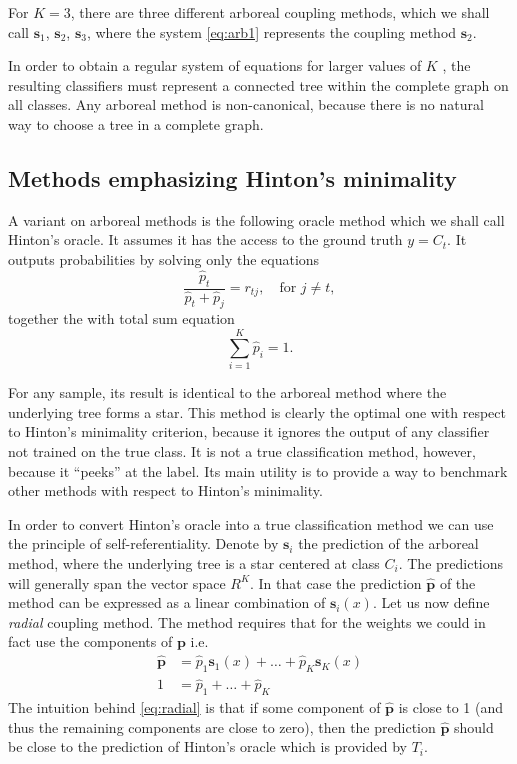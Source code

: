 \documentclass[twoside,11pt]{article}
\begin{document}
For $K=3$, there are three different arboreal coupling methods, which we shall call $\boldsymbol{s}_1$, $\boldsymbol{s}_2$, $\boldsymbol{s}_3$, where the system \eqref{eq:arb1} represents the coupling method $\boldsymbol{s}_2$.

In order to obtain a regular system of equations for  larger values of $K$ , the resulting classifiers must represent a connected tree within the complete graph on all classes. Any arboreal method is non-canonical, because there is no natural way to choose a tree in a complete graph.

\subsection{Methods emphasizing Hinton's minimality}

A variant on arboreal methods is the following oracle method which we shall call Hinton's oracle. It  assumes it has the access to the ground truth $y = C_t$. It outputs probabilities by solving only the equations
$$
\frac{\hat p_t}{\hat p_t + \hat p_j} = {r}_{tj},\quad \textrm{for }j\not = t,
$$
together the  with total sum equation
$$
\sum_{i=1}^K  \hat p_i = 1.
$$

For any sample, its result is identical to the arboreal method where the underlying tree forms a star. This method is clearly the optimal one with respect to Hinton's minimality criterion, because it ignores the output of any classifier not trained on the true class. It is not a true classification method, however, because it ``peeks'' at the label. Its main utility is to provide a way to benchmark other methods with respect to Hinton's minimality.

In order to convert Hinton's oracle into a true classification method we can use the principle of self-referentiality.  Denote by $\boldsymbol{s}_i$ the prediction of the arboreal method, where the underlying tree is a star centered at class $C_i$. The predictions will generally span the vector space $R^K$. In that case the prediction $\hat{\boldsymbol{p}}$ of the method  can be expressed as a linear combination of $\boldsymbol{s}_i(x)$. Let us now define \emph{radial} coupling method. The  method requires that for the  weights we could in fact use the components of $\boldsymbol{p}$ i.e.
\begin{equation}
	\begin{split}
	\hat {\boldsymbol{p}} &= \hat p_1 \boldsymbol{s}_1(x) + \ldots + \hat p_K \boldsymbol{s}_K(x)\\
	1 &= \hat p_1 + \ldots + \hat p_K
	\end{split}
	 \label{eq:radial}
\end{equation}
%
The intuition behind \eqref{eq:radial} is that if some component of $\hat{\boldsymbol{p}}$ is close to 1 (and thus the remaining components are close to zero), then the prediction $\hat{\boldsymbol{p}}$ should be close to the prediction of Hinton's oracle which is provided by ${{T}}_i$.
\end{document}
